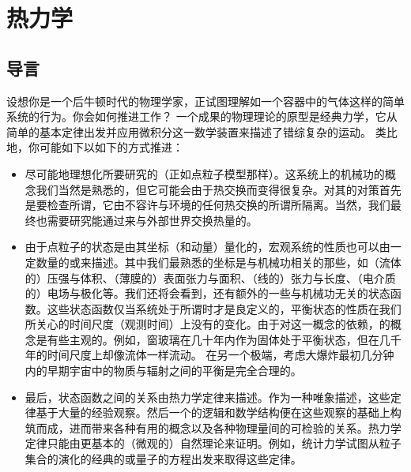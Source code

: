 \chapter{热力学}

\section{导言}


	设想你是一个后牛顿时代的物理学家，正试图理解如一个容器中的气体这样的简单系统的行为。你会如何推进工作？
	一个成果的物理理论的原型是经典力学，它从简单的基本定律出发并应用微积分这一数学装置来描述了错综复杂的运动。
	类比地，你可能如下以如下的方式推进：

	\begin{itemize}
		\item 尽可能地理想化所要研究的（正如点粒子模型那样）。这系统上的机械功的概念我们当然是熟悉的，但它可能会由于热交换而变得很复杂。对其的对策首先是要检查所谓，它由不容许与环境的任何热交换的所谓所隔离。当然，我们最终也需要研究能通过来与外部世界交换热量的。
		\item 由于点粒子的状态是由其坐标（和动量）量化的，宏观系统的性质也可以由一定数量的或来描述。其中我们最熟悉的坐标是与机械功相关的那些，如（流体的）压强与体积、（薄膜的）表面张力与面积、（线的）张力与长度、（电介质的）电场与极化等。我们还将会看到，还有额外的一些与机械功无关的状态函数。这些状态函数仅当系统处于所谓时才是良定义的，平衡状态的性质在我们所关心的时间尺度（观测时间）上没有的变化。由于对这一概念的依赖，的概念是有些主观的。例如，窗玻璃在几十年内作为固体处于平衡状态，但在几千年的时间尺度上却像流体一样流动。 在另一个极端，考虑大爆炸最初几分钟内的早期宇宙中的物质与辐射之间的平衡是完全合理的。
		\item 最后，状态函数之间的关系由热力学定律来描述。作为一种唯象描述，这些定律基于大量的经验观察。然后一个的逻辑和数学结构便在这些观察的基础上构筑而成，进而带来各种有用的概念以及各种物理量间的可检验的关系。热力学定律只能由更基本的（微观的）自然理论来证明。例如，统计力学试图从粒子集合的演化的经典的或量子的方程出发来取得这些定律。
	\end{itemize}

